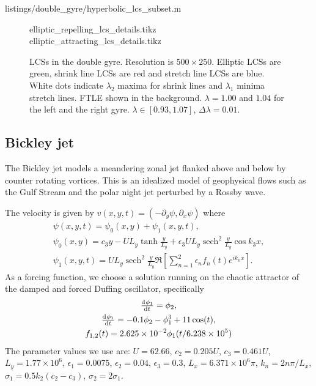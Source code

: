 \documentclass[5p]{elsarticle}
\DeclareMathOperator{\sech}{sech}
\newlength\figurewidth
\begin{document}

        {listings/double_gyre/hyperbolic_lcs_subset.m}

\begin{figure}
\centering
\setlength{}
{elliptic_repelling_lcs_details.tikz}
{elliptic_attracting_lcs_details.tikz}
\caption{
LCSs in the double gyre.
Resolution is $500 \times 250$.
Elliptic LCSs are green, shrink line LCSs are red and stretch line LCSs are blue.
White dots indicate $\lambda_2$ maxima for shrink lines and $\lambda_1$ minima stretch lines.
FTLE shown in the background.
$\lambda = 1.00$ and $1.04$ for the left and the right gyre.
$\lambda \in [0.93,1.07]$, $\Delta\lambda = 0.01$.
}
\label{f:double gyre lambda hyperbolic LCS}
\end{figure}

\subsection{Bickley jet}

The Bickley jet models a meandering zonal jet flanked above and below by
counter rotating vortices. This is an idealized model of geophysical flows such as the Gulf Stream and the polar night jet perturbed by a Rossby wave\citep{castilloNegrete93:_chaot_rossb,beron-vera10:_invar_lagran}.

The velocity is given by $v(x,y,t) = (-\partial_y \psi, \partial_x \psi)$ where
\begin{gather*}
\psi(x,y,t) = \psi_0(x,y) + \psi_1(x,y,t),\\
\psi_0(x,y) = c_3 y - U L_y \tanh\frac{y}{L_y} + \epsilon_3 U L_y \sech^2\frac{y}{L_y} \cos k_3 x,\\
\psi_1(x,y,t) = U L_y \sech^2\frac{y}{L_y} \Re\left[\sum_{n=1}^2 \epsilon_n f_n(t) e^{i k_n x}\right].
\end{gather*}
As a forcing function, we choose a solution running on the chaotic attractor of the damped and forced Duffing oscillator, specifically
\begin{gather*}
\od{\phi_1}{t} = \phi_2,\\
\od{\phi_1}{t} = -0.1 \phi_2 - \phi_1^3 + 11 \cos(t),\\
f_{1,2}(t) = 2.625 \times 10^{-2} \phi_1(t/6.238 \times 10^5)
\end{gather*}
The parameter values we use are: $U = 62.66$, $c_2 = 0.205 U$, $c_3 = 0.461 U$, $L_y = 1.77 \times 10^6$, $\epsilon_1 = 0.0075$, $\epsilon_2 = 0.04$, $\epsilon_3 = 0.3$, $L_x = 6.371 \times 10^6 \pi$, $k_n = 2 n \pi/L_x$, $\sigma_1 = 0.5 k_2 (c_2 - c_3)$, $\sigma_2 = 2 \sigma_1$.
\end{document}
